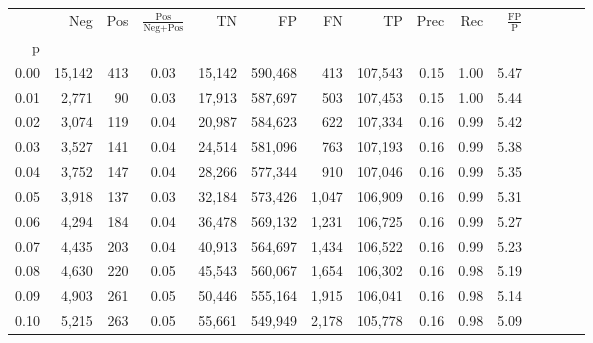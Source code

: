 \begin{tabular}{rrrcrrrrrrrrrrr}
\toprule
{} &     Neg &    Pos & $\frac{\text{Pos}}{\text{Neg}+\text{Pos}}$ &       TN &       FP &       FN &       TP &  Prec &   Rec & $\frac{\text{FP}}{\text{P}}$ \\
p    &         &        &                                            &          &          &          &          &       &       &                              \\
\midrule
0.00 &  15,142 &    413 &                                       0.03 &   15,142 &  590,468 &      413 &  107,543 &  0.15 &  1.00 &                         5.47 \\
0.01 &   2,771 &     90 &                                       0.03 &   17,913 &  587,697 &      503 &  107,453 &  0.15 &  1.00 &                         5.44 \\
0.02 &   3,074 &    119 &                                       0.04 &   20,987 &  584,623 &      622 &  107,334 &  0.16 &  0.99 &                         5.42 \\
0.03 &   3,527 &    141 &                                       0.04 &   24,514 &  581,096 &      763 &  107,193 &  0.16 &  0.99 &                         5.38 \\
0.04 &   3,752 &    147 &                                       0.04 &   28,266 &  577,344 &      910 &  107,046 &  0.16 &  0.99 &                         5.35 \\
0.05 &   3,918 &    137 &                                       0.03 &   32,184 &  573,426 &    1,047 &  106,909 &  0.16 &  0.99 &                         5.31 \\
0.06 &   4,294 &    184 &                                       0.04 &   36,478 &  569,132 &    1,231 &  106,725 &  0.16 &  0.99 &                         5.27 \\
0.07 &   4,435 &    203 &                                       0.04 &   40,913 &  564,697 &    1,434 &  106,522 &  0.16 &  0.99 &                         5.23 \\
0.08 &   4,630 &    220 &                                       0.05 &   45,543 &  560,067 &    1,654 &  106,302 &  0.16 &  0.98 &                         5.19 \\
0.09 &   4,903 &    261 &                                       0.05 &   50,446 &  555,164 &    1,915 &  106,041 &  0.16 &  0.98 &                         5.14 \\
0.10 &   5,215 &    263 &                                       0.05 &   55,661 &  549,949 &    2,178 &  105,778 &  0.16 &  0.98 &                         5.09 \\

\end{tabular}
